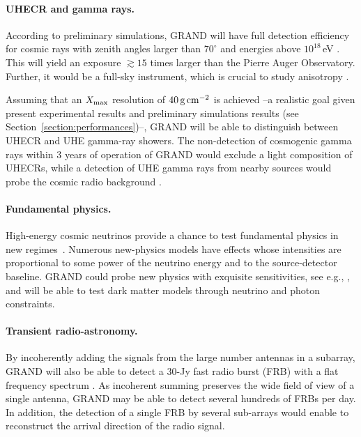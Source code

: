 \documentclass[a4paper,11pt]{article}
\begin{document}
\paragraph{UHECR and gamma rays.} According to preliminary simulations, GRAND will have full detection efficiency for cosmic rays with zenith angles larger than $70^\circ$ and energies above $10^{18}$\,eV \cite{GRAND20}. This will yield an exposure $\gtrsim 15$ times larger than the Pierre Auger Observatory. Further, it would be a full-sky instrument, which is crucial to study anisotropy \cite{Denton_2015}. 

Assuming that an $X_{\rm max}$ resolution of $40\,{\rm g}\,{\rm cm}^{-2}$ is achieved --a realistic goal given present experimental results \cite{Buitink:2016nkf,Bezyazeekov:2015rpa} and preliminary simulations results (see Section~\ref{section:performances})--, GRAND will be able to distinguish between UHECR and UHE gamma-ray showers. The non-detection of cosmogenic gamma rays within 3 years of operation of GRAND would exclude a light composition of UHECRs, while a detection of UHE gamma rays from nearby sources would probe the cosmic radio background \cite{Fixsen:1998kq}.

\paragraph{Fundamental physics.} High-energy cosmic neutrinos provide a chance to test fundamental physics in new regimes~\cite{2019BAAS...51c.215V}.
Numerous new-physics models have effects whose intensities are proportional to some power of the neutrino energy and to the source-detector baseline. GRAND could probe new physics with exquisite sensitivities, see e.g., \cite{2020PhRvD.102l3019D}, and will be able to test dark matter models through neutrino and photon constraints.

\paragraph{Transient radio-astronomy.} By incoherently adding the signals from the large number antennas in a subarray, GRAND will also be able to detect a 30-Jy fast radio burst (FRB) with a flat frequency spectrum \cite{GRAND20}. As incoherent summing preserves the wide field of view of a single antenna, GRAND may be able to detect several hundreds of FRBs per day. In addition, the detection of a single FRB by several sub-arrays would enable to reconstruct the arrival direction of the radio signal.
\end{document}
